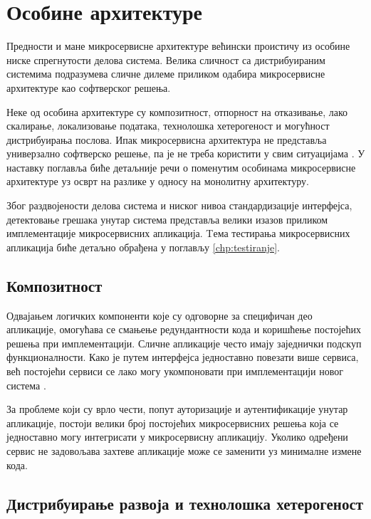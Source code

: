 \documentclass[12pt,oneside]{memoir}
\begin{document}

 \newpage

\section{Особине архитектуре}

Предности и мане микросервисне архитектуре већински проистичу из особине ниске спрегнутости делова система. Велика сличност са дистрибуираним системима подразумева сличне дилеме приликом одабира микросервисне архитектуре као софтверског решења.

Неке од особина архитектуре су композитност, отпорност на отказивање, лако скалирање, локализовање података, технолошка хетерогеност и могућност дистрибуирања послова. Ипак микросервисна архитектура не представља универзално софтверско решење, па је не треба користити у свим ситуацијама \cite{microservicesBook}. У наставку поглавља биће детаљније речи о поменутим особинама микросервисне архитектуре уз осврт на разлике у односу на монолитну архитектуру. 

Због раздвојености делова система и ниског нивоа стандардизације интерфејса, детектовање грешака унутар система представља велики изазов приликом имплементације микросервисних апликација. Tема тестирања микросервисних апликација биће детаљно обрађена у поглављу \ref{chp:testiranje}.

\subsection{Композитност}

Одвајањем логичких компоненти које су одговорне за специфичан део апликације, омогућава се смањење редундантности кода и коришћење постојећих решења при имплементацији. Сличне апликације често имају заједнички подскуп функционалности. Како је путем интерфејса једноставно повезати више сервиса, већ постојећи сервиси се лако могу укомпоновати при имплементацији новог система \cite{microservicesBook}. 

За проблеме који су врло чести, попут ауторизације и аутентификације унутар апликације, постоји велики број постојећих микросервисних решења која се једноставно могу интегрисати у микросервисну апликацију. Уколико одређени сервис не задовољава захтеве апликације може се заменити уз минималне измене кода.

\subsection{Дистрибуирање развоја и технолошка хетерогеност}
\end{document}
